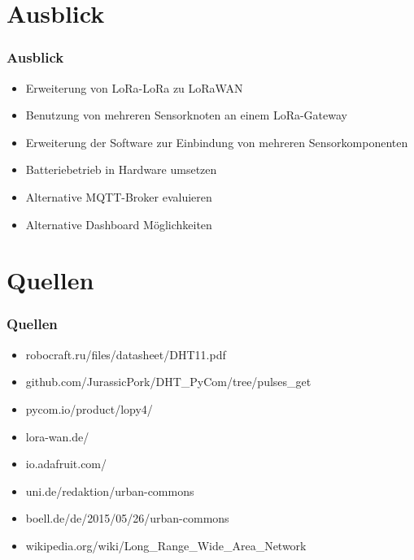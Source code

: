 \documentclass[12pt,utf8]{beamer}
\begin{document}
\section{Ausblick}
\begin{frame}
\frametitle{Ausblick}
\begin{itemize}
\item Erweiterung von LoRa-LoRa zu LoRaWAN
\item Benutzung von mehreren Sensorknoten an einem LoRa-Gateway
\item Erweiterung der Software zur Einbindung von mehreren Sensorkomponenten
\item Batteriebetrieb in Hardware umsetzen
\item Alternative MQTT-Broker evaluieren
\item Alternative Dashboard Möglichkeiten 
\end{itemize}
\end{frame}

\section{Quellen}
\begin{frame}
\frametitle{Quellen}
\begin{itemize}
\item robocraft.ru/files/datasheet/DHT11.pdf
\item github.com/JurassicPork/DHT\_PyCom/tree/pulses\_get
\item pycom.io/product/lopy4/
\item lora-wan.de/
\item io.adafruit.com/
\item uni.de/redaktion/urban-commons
\item boell.de/de/2015/05/26/urban-commons
\item wikipedia.org/wiki/Long\_Range\_Wide\_Area\_Network
\end{itemize}
\end{frame}
\end{document}
